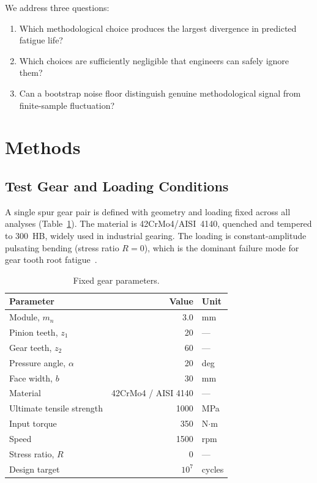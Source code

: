 \documentclass[12pt,a4paper]{article}
\begin{document}
We address three questions:
\begin{enumerate}
  \item Which methodological choice produces the largest divergence in
        predicted fatigue life?
  \item Which choices are sufficiently negligible that engineers can
        safely ignore them?
  \item Can a bootstrap noise floor distinguish genuine methodological
        signal from finite-sample fluctuation?
\end{enumerate}

\section{Methods}
\label{sec:methods}

\subsection{Test Gear and Loading Conditions}

A single spur gear pair is defined with geometry and loading fixed
across all analyses (Table~\ref{tab:gear}). The material is
42CrMo4/AISI~4140, quenched and tempered to 300~HB, widely used in
industrial gearing. The loading is constant-amplitude pulsating bending
(stress ratio $R=0$), which is the dominant failure mode for gear tooth
root fatigue~\cite{iso6336}.

\begin{table}[h]
\centering
\caption{Fixed gear parameters.}
\label{tab:gear}
\begin{tabular}{lrl}
\toprule
Parameter & Value & Unit \\
\midrule
Module, $m_n$ & 3.0 & mm \\
Pinion teeth, $z_1$ & 20 & --- \\
Gear teeth, $z_2$ & 60 & --- \\
Pressure angle, $\alpha$ & 20 & deg \\
Face width, $b$ & 30 & mm \\
Material & 42CrMo4 / AISI 4140 & --- \\
Ultimate tensile strength & 1000 & MPa \\
Input torque & 350 & N$\cdot$m \\
Speed & 1500 & rpm \\
Stress ratio, $R$ & 0 & --- \\
Design target & $10^7$ & cycles \\
\bottomrule
\end{tabular}
\end{table}
\end{document}
